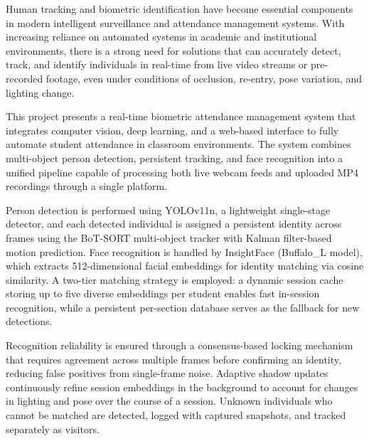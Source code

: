\documentclass{report}
\begin{document}
\noindent
\normalsize{Human tracking and biometric identification have become essential components in modern intelligent\vspace{3pt} surveillance and attendance management systems. With increasing reliance on automated systems in\vspace{3pt} academic and institutional environments, there is a strong need for solutions that can accurately detect,\vspace{3pt} track, and identify individuals in real-time from live video streams or pre-recorded footage, even under\vspace{3pt} conditions of occlusion, re-entry, pose variation, and lighting change.

This project presents a real-time biometric attendance management system that integrates computer\vspace{3pt} vision, deep learning, and a web-based interface to fully automate student attendance in classroom\vspace{3pt} environments. The system combines multi-object person detection, persistent tracking, and face recogni\vspace{3pt}tion into a unified pipeline capable of processing both live webcam feeds and uploaded MP4 recordings\vspace{3pt} through a single platform.

Person detection is performed using YOLOv11n, a lightweight single-stage detector, and each detected\vspace{3pt} individual is assigned a persistent identity across frames using the BoT-SORT multi-object tracker with\vspace{3pt} Kalman filter-based motion prediction. Face recognition is handled by InsightFace (Buffalo\_L model),\vspace{3pt} which extracts 512-dimensional facial embeddings for identity matching via cosine similarity. A two-tier\vspace{3pt} matching strategy is employed: a dynamic session cache storing up to five diverse embeddings per student\vspace{3pt} enables fast in-session recognition, while a persistent per-section database serves as the fallback for\vspace{3pt} new detections.

Recognition reliability is ensured through a consensus-based locking mechanism that requires agree\vspace{3pt}ment across multiple frames before confirming an identity, reducing false positives from single-frame\vspace{3pt} noise. Adaptive shadow updates continuously refine session embeddings in the background to account\vspace{3pt} for changes in lighting and pose over the course of a session. Unknown individuals who cannot be\vspace{3pt} matched are detected, logged with captured snapshots, and tracked separately as visitors.

}
\end{document}
